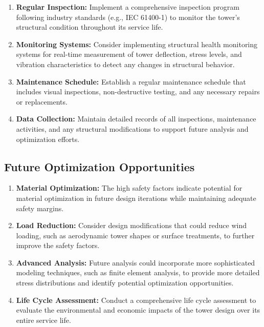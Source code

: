 \documentclass[12pt]{article}
\begin{document}
\begin{enumerate}
    \item \textbf{Regular Inspection:} Implement a comprehensive inspection program following industry standards (e.g., IEC 61400-1) to monitor the tower's structural condition throughout its service life.
    
    \item \textbf{Monitoring Systems:} Consider implementing structural health monitoring systems for real-time measurement of tower deflection, stress levels, and vibration characteristics to detect any changes in structural behavior.
    
    \item \textbf{Maintenance Schedule:} Establish a regular maintenance schedule that includes visual inspections, non-destructive testing, and any necessary repairs or replacements.
    
    \item \textbf{Data Collection:} Maintain detailed records of all inspections, maintenance activities, and any structural modifications to support future analysis and optimization efforts.
\end{enumerate}

\subsection{Future Optimization Opportunities}

\begin{enumerate}
    \item \textbf{Material Optimization:} The high safety factors indicate potential for material optimization in future design iterations while maintaining adequate safety margins.
    
    \item \textbf{Load Reduction:} Consider design modifications that could reduce wind loading, such as aerodynamic tower shapes or surface treatments, to further improve the safety factors.
    
    \item \textbf{Advanced Analysis:} Future analysis could incorporate more sophisticated modeling techniques, such as finite element analysis, to provide more detailed stress distributions and identify potential optimization opportunities.
    
    \item \textbf{Life Cycle Assessment:} Conduct a comprehensive life cycle assessment to evaluate the environmental and economic impacts of the tower design over its entire service life.
\end{enumerate}
\end{document}
